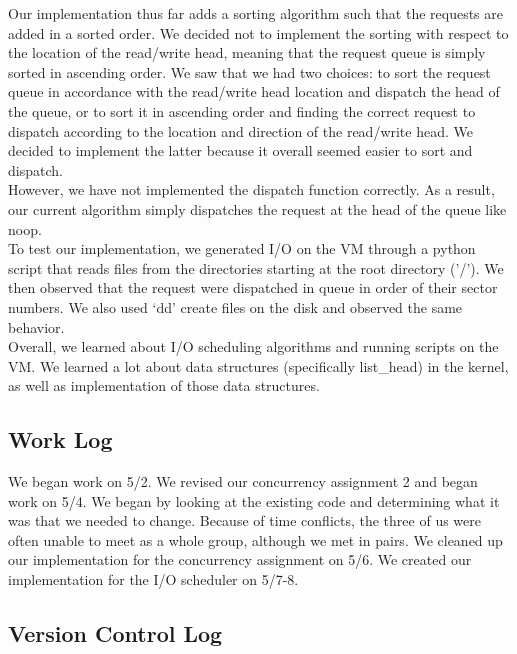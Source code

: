 \documentclass[journal, letterpaper, draftclsnofoot, onecolumn, 10pt]{IEEEtran}
\begin{document}


Our implementation thus far adds a sorting algorithm such that the requests are added in a sorted order. We decided not to implement
the sorting with respect to the location of the read/write head, meaning that the request queue is simply sorted in ascending order.
We saw that we had two choices: to sort the request queue in accordance with the read/write head location and dispatch the head of
the queue, or to sort it in ascending order and finding the correct request to dispatch according to the location and direction of
the read/write head. We decided to implement the latter because it overall seemed easier to sort and dispatch. \\

However, we have not implemented the dispatch function correctly. As a result, our current algorithm simply dispatches the request
at the head of the queue like noop. \\ 


To test our implementation, we generated I/O on the VM through a python script that reads files from the directories starting at the
root directory ('/'). We then observed that the request were dispatched in queue in order of their sector numbers. We also used `dd'
create files on the disk and observed the same behavior. \\



Overall, we learned about I/O scheduling algorithms and running scripts on the VM. We learned a lot about data structures
(specifically list\_head) in the kernel, as well as implementation of those data structures.\\

\subsection{Work Log}
We began work on 5/2. We revised our concurrency assignment 2 and began work on 5/4. We began by looking
at the existing code and determining what it was that we needed to change. Because of time conflicts, the three of us were often unable
to meet as a whole group, although we met in pairs. We cleaned up our implementation for the concurrency assignment on 5/6.
We created our implementation for the I/O scheduler on 5/7-8.

\clearpage
\subsection{Version Control Log}
\end{document}
